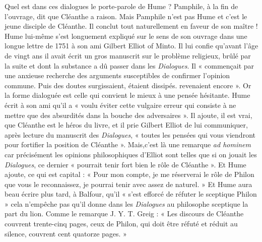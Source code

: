 Quel est dans ces dialogues le porte-parole de Hume ?
Pamphile, à la fin de l’ouvrage, dit que Cléanthe a raison.
Mais Pamphile n’est pas Hume et c’est le jeune disciple
de Cléanthe. Il conclut tout naturellement en faveur de
son maître ! Hume lui-même s’est longuement expliqué
sur le sens de son ouvrage dans une longue lettre de 1751
à son ami Gilbert Elliot of Minto. Il lui confie qu'avant
l’âge de vingt ans il avait écrit un gros manuscrit sur le
problème religieux, brûlé par la suite et dont la substance
a dû passer dans les {\it Dialogues}. Il « commençait par une
anxieuse recherche des arguments susceptibles de confirmer
l’opinion commune. Puis des doutes surgissaient,
étaient dissipés. revenaient encore ». Or la forme dialoguée
est celle qui convient le mieux à une pensée hésitante.
Hume écrit à son ami qu’il a « voulu éviter cette vulgaire
erreur qui consiste à ne mettre que des absurdités dans
la bouche des adversaires ». Il ajoute, il est vrai, que
Cléanthe est le héros du livre, et il prie Gilbert Elliot de
lui communiquer, après lecture du manuscrit des {\it Dialogues},
« toutes les pensées qui vous viendront pour fortifier la position
de Cléanthe ». Mais,c’est là une remarque
{\it ad hominem} car précisément les opinions philosophiques
d’Elliot sont telles que si on jouait les {\it Dialogues}, ce dernier
« pourrait tenir fort bien le rôle de Cléanthe ». Et Hume
ajoute, ce qui est capital : « Pour mon compte, je me
réserverai le rôle de Philon que vous le reconnaissez,
je pourrai tenir avec assez de naturel. » Et Hume aura
beau écrire plus tard, à Balfour, qu’il « s’est efforcé de
réfuter le sceptique Philon » cela n’empêche pas qu'il
donne dans les {\it Dialogues} au philosophe sceptique la
part du lion. Comme le remarque J. Y. T. Greig : « Les
discours de Cléanthe couvrent trente-cinq pages, ceux de
Philon, qui doit être réfuté et réduit au silence, couvrent
cent quatorze pages. »

